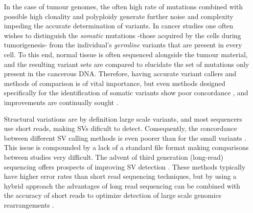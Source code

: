 \begin{justify}
In the case of tumour genomes, the often high rate of mutations combined with possible high clonality and polyploidy generate further noise and complexity impeding the accurate determination of variants. In cancer studies one often wishes to distinguish the \emph{somatic} mutations -those acquired by the cells during tumorigenesis- from the individual's \emph{germline} variants that are present in every cell. To this end, normal tissue is often sequenced alongside the tumour material, and the resulting variant sets are compared to elucidate the set of mutations only present in the cancerous DNA. Therefore, having accurate variant callers and methods of comparison is of vital importance, but even methods designed specifically for the identification of somatic variants \cite{xu2014comparison,kim2013comparing,roberts2013comparative} show poor concordance \cite{alioto2015comprehensive, kroigaard2016evaluation, orawe2013}, and improvements are continually sought \cite{callari2017,vijayan2017}.

Structural variations are by definition large scale variants, and most sequencers use short reads, making SVs dificult to detect. Consequently, the concordance between different SV calling methods is even poorer than for the small variants \cite{sedlazeck2017}. This issue is compounded by a lack of a standard file format \cite{scherer2007} making comparisons between studies very difficult. The advent of third generation (long-read) sequencing offers prospects of improving SV detection \cite{sedlazeck2018,merker2017}. These methods typically have higher error rates than short read sequencing techniques, but by using a hybrid approach the advantages of long read sequencing can be combined with the accuracy of short reads to optimize detection of large scale genomics rearrangements \cite{fan2017hysa,weissensteiner2017, miller2017, ritz2014}.


\end{justify}
